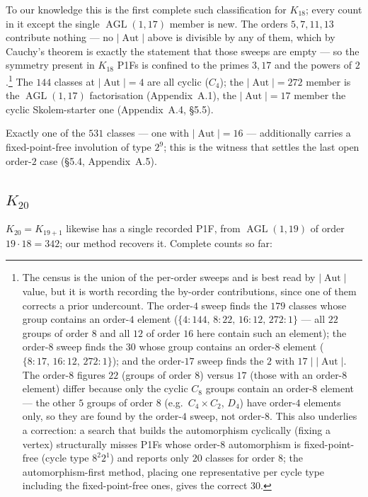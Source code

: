\documentclass[11pt,reqno]{amsart}
\theoremstyle{plain}
\theoremstyle{definition}
\numberwithin{theorem}{section}
\newcommand{\Aut}{\operatorname{Aut}}
\newcommand{\AGL}{\operatorname{AGL}}
\begin{document}
To our knowledge this is the first complete such classification for $K_{18}$; every
count in it except the single $\AGL(1,17)$ member is new. The orders
$5,7,11,13$ contribute nothing --- no $|\Aut|$ above is divisible by any of them,
which by Cauchy's theorem is exactly the statement that those sweeps are empty --- so the
symmetry present in $K_{18}$ P1Fs is confined to the primes $3,17$ and the powers of
$2$.\footnote{The census is the union of the per-order sweeps and is best read by
$|\Aut|$ value, but it is worth recording the by-order contributions, since one
of them corrects a prior undercount. The order-$4$ sweep finds the $179$ classes whose
group contains an order-$4$ element ($\{4{:}144,\,8{:}22,\,16{:}12,\,272{:}1\}$ --- all
$22$ groups of order $8$ and all $12$ of order $16$ here contain such an element); the
order-$8$ sweep finds the $30$ whose group contains an order-$8$ element
($\{8{:}17,\,16{:}12,\,272{:}1\}$); and the order-$17$ sweep finds the $2$ with
$17\mid|\Aut|$. The order-$8$ figures $22$ (groups of order $8$) versus $17$
(those with an order-$8$ element) differ because only the cyclic $C_8$ groups contain
an order-$8$ element --- the other $5$ groups of order $8$ (e.g.\ $C_4\times C_2$, $D_4$)
have order-$4$ elements only, so they are found by the order-$4$ sweep, not order-$8$.
This also underlies a correction: a search that builds the automorphism cyclically
(fixing a vertex) structurally misses P1Fs whose order-$8$ automorphism is
fixed-point-free (cycle type $8^2 2^1$) and reports only $20$ classes for order $8$;
the automorphism-first method, placing one representative per cycle type including the
fixed-point-free ones, gives the correct $30$.} The $144$ classes at $|\Aut|=4$ are all cyclic ($C_4$); the
$|\Aut|=272$ member is the $\AGL(1,17)$ factorisation (Appendix~A.1),
the $|\Aut|=17$ member the cyclic Skolem-starter one (Appendix~A.4, \S5.5).

Exactly one of the $531$ classes --- one with $|\Aut|=16$ --- additionally carries
a fixed-point-free involution of type $2^9$; this is the witness that settles the last
open order-$2$ case (\S5.4, Appendix~A.5).

\subsection{$K_{20}$}

$K_{20}=K_{19+1}$ likewise has a single recorded P1F, from $\AGL(1,19)$ of
order $19\cdot 18=342$; our method recovers it. Complete counts so far:
\end{document}
